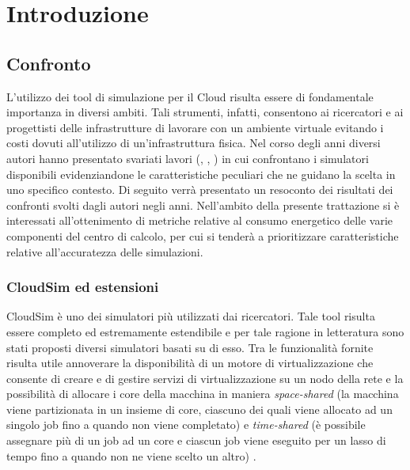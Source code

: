 
\chapter{Introduzione}

\begin{citazione}
\end{citazione}
\newpage

\section{Confronto} { 
L'utilizzo dei tool di simulazione per il Cloud risulta essere di fondamentale importanza in diversi ambiti. Tali strumenti, infatti, consentono ai ricercatori e ai progettisti delle infrastrutture di lavorare con un ambiente virtuale evitando i costi dovuti all'utilizzo di un'infrastruttura fisica. Nel corso degli anni diversi autori hanno presentato svariati lavori (\cite{mansouri2020cloud}, \cite{suryateja2016comparative}, \cite{abreu2020comparative}) in cui confrontano i simulatori disponibili evidenziandone le caratteristiche peculiari che ne guidano la scelta in uno specifico contesto. Di seguito verrà presentato un resoconto dei risultati dei confronti svolti dagli autori negli anni. 
Nell'ambito della presente trattazione si è interessati all'ottenimento di metriche relative al consumo energetico delle varie componenti del centro di calcolo, per cui si tenderà a prioritizzare caratteristiche relative all'accuratezza delle simulazioni.
\subsection{CloudSim ed estensioni}
CloudSim \cite{calheiros2011cloudsim} è uno dei simulatori più utilizzati dai ricercatori. Tale tool risulta essere completo ed estremamente estendibile e per tale ragione in letteratura sono stati proposti diversi simulatori basati su di esso. Tra le funzionalità fornite risulta utile annoverare la disponibilità di un motore di virtualizzazione che consente di creare e di gestire servizi di virtualizzazione su un nodo della rete e la possibilità di allocare i core della macchina in maniera \emph{space-shared} (la macchina viene partizionata in un insieme di core, ciascuno dei quali viene allocato ad un singolo job fino a quando non viene completato) e \emph{time-shared} (è possibile assegnare più di un job ad un core e ciascun job viene eseguito per un lasso di tempo fino a quando non ne viene scelto un altro) \cite{mansouri2020cloud}. 
}

